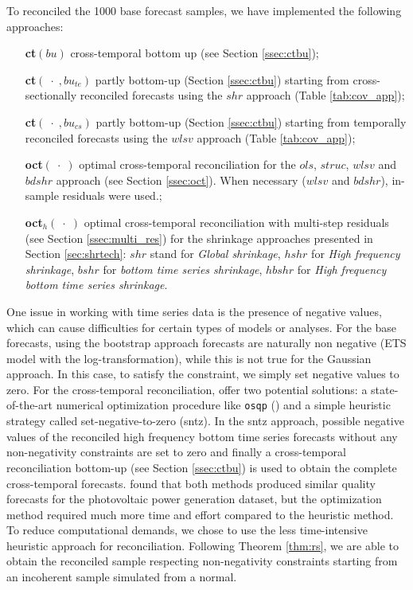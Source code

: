 \documentclass[a4paper,11pt]{article}
\theoremstyle{definition}
\begin{document}
To reconciled the 1000 base forecast samples, we have implemented the following approaches:
\begin{itemize}[nosep, leftmargin = 2.5cm]
	\item[\textbf{ct}$(bu)$] cross-temporal bottom up (see Section \ref{ssec:ctbu});
	\item[\textbf{ct}$(\;\cdot\;, bu_{te})$] partly bottom-up (Section \ref{ssec:ctbu}) starting from cross-sectionally reconciled forecasts using the $shr$ approach (Table \ref{tab:cov_app});
	\item[\textbf{ct}$(\;\cdot\;, bu_{cs})$] partly bottom-up (Section \ref{ssec:ctbu}) starting from temporally reconciled forecasts using the $wlsv$ approach (Table \ref{tab:cov_app});
	\item[\textbf{oct}$(\;\cdot\;)$] optimal cross-temporal reconciliation for the $ols$, $struc$, $wlsv$ and $bdshr$ approach (see Section \ref{ssec:oct}). When necessary ($wlsv$ and $bdshr$), in-sample residuals were used.;
	\item[\textbf{oct}$_{h}(\;\cdot\;)$] optimal cross-temporal reconciliation with multi-step residuals (see Section \ref{ssec:multi_res}) for the shrinkage approaches presented in Section \ref{sec:shrtech}: $shr$ stand for \textit{Global shrinkage}, $hshr$ for \textit{High frequency shrinkage}, $bshr$ for \textit{bottom time series shrinkage}, $hbshr$ for \textit{High frequency bottom time series shrinkage}.
\end{itemize}
One issue in working with time series data is the presence of negative values, which can cause difficulties for certain types of models or analyses.
For the base forecasts, using the bootstrap approach forecasts are naturally non negative (ETS model with the log-transformation), while this is not true for the Gaussian approach. In this case, to satisfy the constraint, we simply set negative values to zero. For the cross-temporal reconciliation, \citet{difonzo2023} offer two potential solutions: a state-of-the-art numerical optimization procedure like \texttt{osqp} (\citealp{stellato2019, stellato2020}) and a simple heuristic strategy called set-negative-to-zero (sntz). In the sntz approach, possible negative values of the reconciled high frequency bottom time series forecasts without any non-negativity constraints are set to zero and finally a cross-temporal reconciliation bottom-up (see Section \ref{ssec:ctbu}) is used to obtain the complete cross-temporal forecasts. \cite{difonzo2023a} found that both methods produced similar quality forecasts for the photovoltaic power generation dataset, but the optimization method required much more time and effort compared to the heuristic method. To reduce computational demands, we chose to use the less time-intensive heuristic approach for reconciliation. Following Theorem \ref{thm:rs}, we are able to obtain the reconciled sample respecting non-negativity constraints starting from an incoherent sample simulated from a normal.
\end{document}
